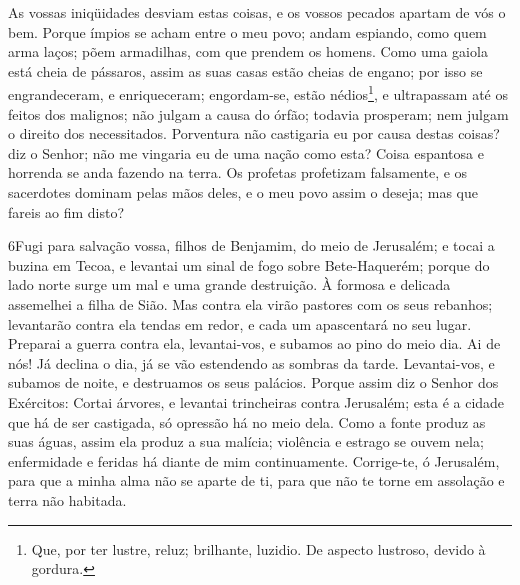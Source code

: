 As vossas iniqüidades desviam estas coisas, e os vossos pecados
apartam de vós o bem. Porque ímpios se acham entre o meu
povo; andam espiando, como quem arma laços; põem armadilhas, com que
prendem os homens. Como uma gaiola está cheia de pássaros,
assim as suas casas estão cheias de engano; por isso se
engrandeceram, e enriqueceram; engordam-se, estão
nédios\footnote{Que, por ter lustre, reluz; brilhante, luzidio. De
aspecto lustroso, devido à gordura.}, e ultrapassam até os feitos
dos malignos; não julgam a causa do órfão; todavia prosperam; nem
julgam o direito dos necessitados. Porventura não castigaria
eu por causa destas coisas? diz o Senhor; não me vingaria eu de uma
nação como esta? Coisa espantosa e horrenda se anda fazendo
na terra. Os profetas profetizam falsamente, e os sacerdotes
dominam pelas mãos deles, e o meu povo assim o deseja; mas que
fareis ao fim disto?

\medskip

\lettrine{6} Fugi para salvação vossa, filhos de Benjamim, do
meio de Jerusalém; e tocai a buzina em Tecoa, e levantai um sinal de
fogo sobre Bete-Haquerém; porque do lado norte surge um mal e uma
grande destruição. À formosa e delicada assemelhei a filha de
Sião. Mas contra ela virão pastores com os seus rebanhos;
levantarão contra ela tendas em redor, e cada um apascentará no seu
lugar. Preparai a guerra contra ela, levantai-vos, e subamos ao
pino do meio dia. Ai de nós! Já declina o dia, já se vão estendendo
as sombras da tarde. Levantai-vos, e subamos de noite, e
destruamos os seus palácios. Porque assim diz o Senhor dos
Exércitos: Cortai árvores, e levantai trincheiras contra Jerusalém;
esta é a cidade que há de ser castigada, só opressão há no meio
dela. Como a fonte produz as suas águas, assim ela produz a sua
malícia; violência e estrago se ouvem nela; enfermidade e feridas há
diante de mim continuamente. Corrige-te, ó Jerusalém, para que a
minha alma não se aparte de ti, para que não te torne em assolação e
terra não habitada.

